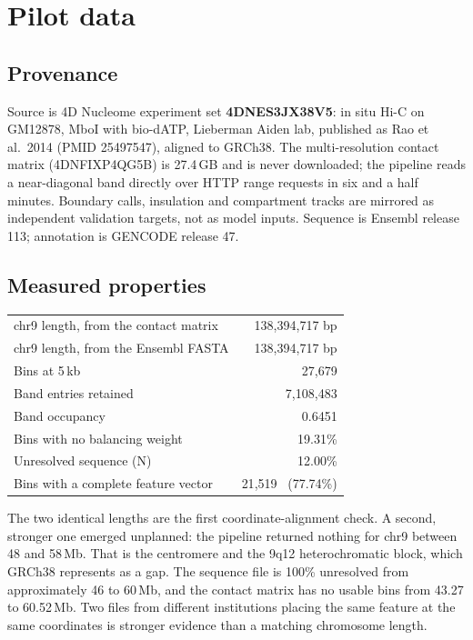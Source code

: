 \documentclass[11pt,a4paper]{article}
\begin{document}
\section{Pilot data}

\subsection{Provenance}

Source is 4D Nucleome experiment set \textbf{4DNES3JX38V5}: in situ Hi-C on
GM12878, MboI with bio-dATP, Lieberman Aiden lab, published as Rao et al.\ 2014
(PMID 25497547), aligned to GRCh38. The multi-resolution contact matrix
(4DNFIXP4QG5B) is 27.4\,GB and is never downloaded; the pipeline reads a
near-diagonal band directly over HTTP range requests in six and a half minutes.
Boundary calls, insulation and compartment tracks are mirrored as independent
validation targets, not as model inputs. Sequence is Ensembl release 113;
annotation is GENCODE release 47.

\subsection{Measured properties}

\begin{table}[h]\centering
\begin{tabular}{@{}lr@{}}
\toprule
chr9 length, from the contact matrix & 138{,}394{,}717 bp \\
chr9 length, from the Ensembl FASTA & 138{,}394{,}717 bp \\
Bins at 5\,kb & 27{,}679 \\
Band entries retained & 7{,}108{,}483 \\
Band occupancy & 0.6451 \\
Bins with no balancing weight & 19.31\% \\
Unresolved sequence (N) & 12.00\% \\
Bins with a complete feature vector & 21{,}519 \ (77.74\%) \\
\bottomrule
\end{tabular}
\end{table}

The two identical lengths are the first coordinate-alignment check. A second,
stronger one emerged unplanned: the pipeline returned nothing for chr9 between 48
and 58\,Mb. That is the centromere and the 9q12 heterochromatic block, which
GRCh38 represents as a gap. The sequence file is 100\% unresolved from
approximately 46 to 60\,Mb, and the contact matrix has no usable bins from 43.27
to 60.52\,Mb. Two files from different institutions placing the same feature at
the same coordinates is stronger evidence than a matching chromosome length.
\end{document}
